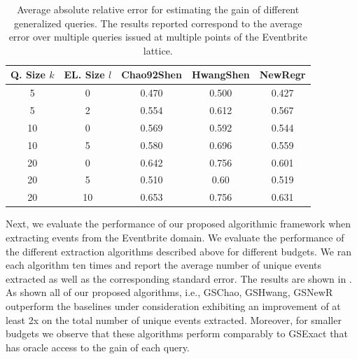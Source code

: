 \documentclass{vldb}
\begin{document}
\begin{table}
\small\center
\caption{Average absolute relative error for estimating the gain of different generalized queries. The results reported correspond to the average error over multiple queries issued at multiple points of the Eventbrite lattice.}
\label{tab:eventesterror}
\begin{tabular}{|c|c|c|c|c|}
\hline
\textbf{Q. Size $k$} & \textbf{EL. Size $l$} & \textbf{Chao92Shen} & \textbf{HwangShen} & \textbf{NewRegr} \\ \hline
5 & 0 & 0.470 & 0.500 & 0.427 \\
5 & 2 & 0.554 & 0.612 & 0.567\\
10 & 0 & 0.569 & 0.592 & 0.544\\
10 & 5 & 0.580 & 0.696 & 0.559\\
20 & 0 & 0.642 & 0.756 &0.601\\
20 & 5 & 0.510 & 0.60 & 0.519 \\
20 & 10 & 0.653 & 0.756 & 0.631\\
\hline
\end{tabular}
\vspace{-10pt}
\end{table}


Next, we evaluate the performance of our proposed algorithmic framework when extracting events from the Eventbrite domain. We evaluate the performance of the different extraction algorithms described above for different budgets. We ran each algorithm ten times and report the average number of unique events extracted as well as the corresponding standard error. The results are shown in . As shown all of our proposed algorithms, i.e., GSChao, GSHwang, GSNewR outperform the baselines under consideration exhibiting an improvement of at least 2x on the total number of unique events extracted. Moreover, for smaller budgets we observe that these algorithms perform comparably to GSExact that has oracle access to the gain of each query.
\end{document}
